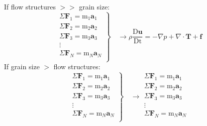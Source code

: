 \documentclass{beamer}
\newcommand{\topline}{%
 \tikz[remember picture,overlay] {%
   \draw[black!100] ([yshift=-1cm]current page.north west)
            --([yshift=-1cm,xshift=\paperwidth]current page.north west);}}
\begin{document}
\begin{frame}[c]%
   {If flow structures $>>$ grain size:
  \begin{equation*}
    \left.
  \begin{array}{c}
      \Sigma \mathbf{F}_1 = \textrm{m}_1 \mathbf{a}_1 \\
      \Sigma \mathbf{F}_2 = \textrm{m}_2 \mathbf{a}_2  \\
      \Sigma \mathbf{F}_3 = \textrm{m}_3 \mathbf{a}_3 \\
          \vdots \\
      \Sigma \mathbf{F}_N = \textrm{m}_N \mathbf{a}_N \\
    \end{array} \right\} \quad \longrightarrow
    \rho{\frac{\mathrm{D}\mathbf{u}}{\mathrm{Dt}}}=-\nabla p + \nabla \cdot \mathbf{T} + \mathbf{f}
               \end{equation*}
      }
   {If grain size $>$ flow structures:
  \begin{equation*}
    \left.
  \begin{array}{c}
      \Sigma \mathbf{F}_1 = \textrm{m}_1 \mathbf{a}_1 \\
      \Sigma \mathbf{F}_2 = \textrm{m}_2 \mathbf{a}_2  \\
      \Sigma \mathbf{F}_3 = \textrm{m}_3 \mathbf{a}_3 \\
          \vdots \\
      \Sigma \mathbf{F}_N = \textrm{m}_N \mathbf{a}_N \\
    \end{array} \right\} \quad \longrightarrow
  \begin{array}{c}
      \Sigma \mathbf{F}_1 = \textrm{m}_1 \mathbf{a}_1 \\
      \Sigma \mathbf{F}_2 = \textrm{m}_2 \mathbf{a}_2  \\
      \Sigma \mathbf{F}_3 = \textrm{m}_3 \mathbf{a}_3 \\
          \vdots \\
      \Sigma \mathbf{F}_N = \textrm{m}_N \mathbf{a}_N \\
    \end{array}
  \end{equation*}
  }

\end{frame}
\end{document}

